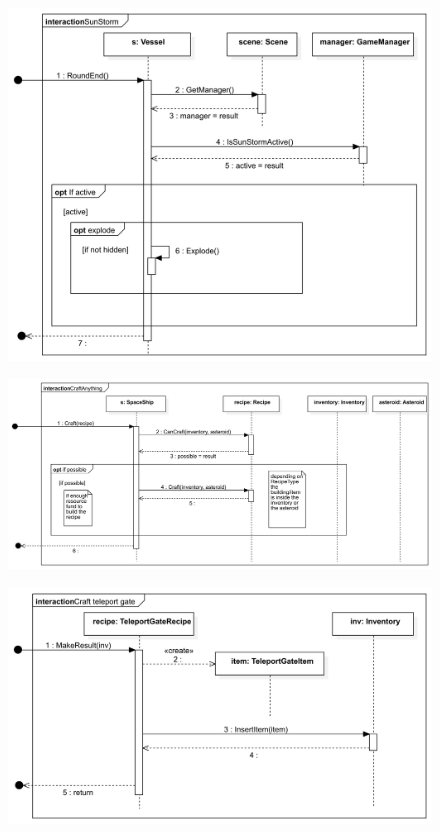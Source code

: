 \begin{figure}[H] 
\centering 
\includegraphics[width=1\textwidth]{docs/3_Project/svg/Design Model!Sun storm!Sun Storm!SunStorm_18.png} 
\end{figure} 

\begin{figure}[H] 
\centering 
\includegraphics[width=1\textwidth]{docs/3_Project/svg/Design Model!Crafting!Craft!CraftAnything_19.png} 
\end{figure} 

\begin{figure}[H] 
\centering 
\includegraphics[width=1\textwidth]{docs/3_Project/svg/Design Model!Crafting!Craft teleport gate!Craft teleport gate_20.png} 
\end{figure} 

